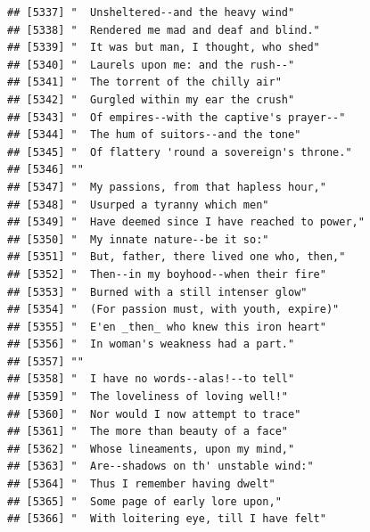 \documentclass{article}\usepackage[]{graphicx}\usepackage[]{color}
\makeatletter
\newenvironment{kframe}{%
 \def\at@end@of@kframe{}%
 \ifinner\ifhmode%
  \def\at@end@of@kframe{\end{minipage}}%
  \begin{minipage}{\columnwidth}%
 \fi\fi%
 \def\FrameCommand##1{\hskip\@totalleftmargin \hskip-\fboxsep
 \colorbox{shadecolor}{##1}\hskip-\fboxsep
     \hskip-\linewidth \hskip-\@totalleftmargin \hskip\columnwidth}%
 \MakeFramed {\advance\hsize-\width
   \@totalleftmargin\z@ \linewidth\hsize
   \@setminipage}}%
 {\par\unskip\endMakeFramed%
 \at@end@of@kframe}
\newenvironment{knitrout}{}{} %
\makeatother
\begin{document}
\begin{knitrout}
\begin{kframe}
\begin{verbatim}
## [5337] "  Unsheltered--and the heavy wind"                                           
## [5338] "  Rendered me mad and deaf and blind."                                       
## [5339] "  It was but man, I thought, who shed"                                       
## [5340] "  Laurels upon me: and the rush--"                                           
## [5341] "  The torrent of the chilly air"                                             
## [5342] "  Gurgled within my ear the crush"                                           
## [5343] "  Of empires--with the captive's prayer--"                                   
## [5344] "  The hum of suitors--and the tone"                                          
## [5345] "  Of flattery 'round a sovereign's throne."                                  
## [5346] ""                                                                            
## [5347] "  My passions, from that hapless hour,"                                      
## [5348] "  Usurped a tyranny which men"                                               
## [5349] "  Have deemed since I have reached to power,"                                
## [5350] "  My innate nature--be it so:"                                               
## [5351] "  But, father, there lived one who, then,"                                   
## [5352] "  Then--in my boyhood--when their fire"                                      
## [5353] "  Burned with a still intenser glow"                                         
## [5354] "  (For passion must, with youth, expire)"                                    
## [5355] "  E'en _then_ who knew this iron heart"                                      
## [5356] "  In woman's weakness had a part."                                           
## [5357] ""                                                                            
## [5358] "  I have no words--alas!--to tell"                                           
## [5359] "  The loveliness of loving well!"                                            
## [5360] "  Nor would I now attempt to trace"                                          
## [5361] "  The more than beauty of a face"                                            
## [5362] "  Whose lineaments, upon my mind,"                                           
## [5363] "  Are--shadows on th' unstable wind:"                                        
## [5364] "  Thus I remember having dwelt"                                              
## [5365] "  Some page of early lore upon,"                                             
## [5366] "  With loitering eye, till I have felt"                                      

\end{verbatim}
\end{kframe}
\end{knitrout}
\end{document}
